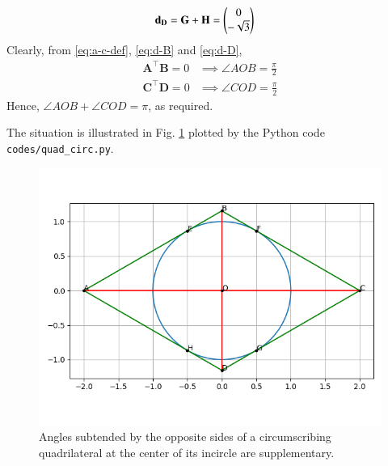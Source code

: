 \documentclass[journal,12pt,twocolumn]{IEEEtran}
\renewcommand{\vec}[1]{\boldsymbol{\mathbf{#1}}}
\begin{document}
\begin{enumerate}
\begin{align}
        \vec{d_D} &= \vec{G} + \vec{H} = \myvec{0\\-\sqrt{3}} \label{eq:d-D}
    \end{align}
    Clearly, from \eqref{eq:a-c-def}, \eqref{eq:d-B} and \eqref{eq:d-D},
    \begin{align}
        \vec{A}^\top\vec{B} = 0 &\implies \angle AOB = \frac{\pi}{2} \\
        \vec{C}^\top\vec{D} = 0 &\implies \angle COD = \frac{\pi}{2}
    \end{align}
    Hence, $\angle AOB + \angle COD = \pi$, as required.

    The situation is illustrated in Fig. \ref{fig:quad-circ} plotted 
    by the Python code \texttt{codes/quad\_circ.py}.
    \begin{figure}[!ht]
        \centering
        \includegraphics[width=\columnwidth]{figs/quad_circ.png}
        \caption{Angles subtended by the opposite sides of a circumscribing quadrilateral at the center of its incircle are supplementary.}
        \label{fig:quad-circ}
    \end{figure}
\end{enumerate}
\end{document}
